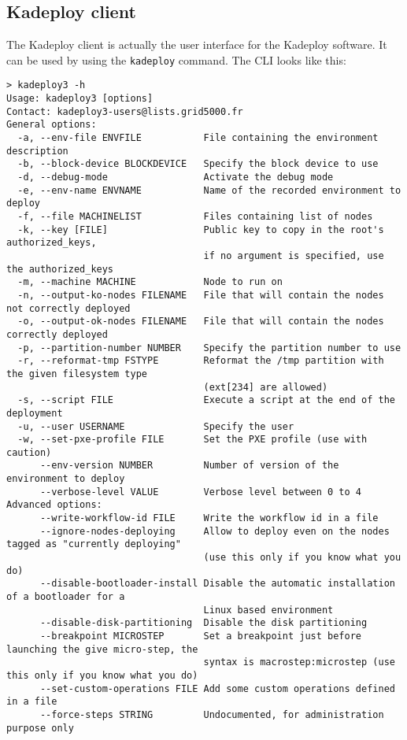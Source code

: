 \documentclass[a4wide,10pt,oneside]{book}
\begin{document}
\subsection{Kadeploy client}
The Kadeploy client is actually the user interface for the Kadeploy software. It can be used by using the \texttt{kadeploy} command. The CLI looks like this:
\begin{small}
\begin{verbatim}
> kadeploy3 -h
Usage: kadeploy3 [options]
Contact: kadeploy3-users@lists.grid5000.fr
General options:
  -a, --env-file ENVFILE           File containing the environment description
  -b, --block-device BLOCKDEVICE   Specify the block device to use
  -d, --debug-mode                 Activate the debug mode
  -e, --env-name ENVNAME           Name of the recorded environment to deploy
  -f, --file MACHINELIST           Files containing list of nodes
  -k, --key [FILE]                 Public key to copy in the root's authorized_keys, 
                                   if no argument is specified, use the authorized_keys
  -m, --machine MACHINE            Node to run on
  -n, --output-ko-nodes FILENAME   File that will contain the nodes not correctly deployed
  -o, --output-ok-nodes FILENAME   File that will contain the nodes correctly deployed
  -p, --partition-number NUMBER    Specify the partition number to use
  -r, --reformat-tmp FSTYPE        Reformat the /tmp partition with the given filesystem type
                                   (ext[234] are allowed)
  -s, --script FILE                Execute a script at the end of the deployment
  -u, --user USERNAME              Specify the user
  -w, --set-pxe-profile FILE       Set the PXE profile (use with caution)
      --env-version NUMBER         Number of version of the environment to deploy
      --verbose-level VALUE        Verbose level between 0 to 4
Advanced options:
      --write-workflow-id FILE     Write the workflow id in a file
      --ignore-nodes-deploying     Allow to deploy even on the nodes tagged as "currently deploying" 
                                   (use this only if you know what you do)
      --disable-bootloader-install Disable the automatic installation of a bootloader for a 
                                   Linux based environment
      --disable-disk-partitioning  Disable the disk partitioning
      --breakpoint MICROSTEP       Set a breakpoint just before launching the give micro-step, the 
                                   syntax is macrostep:microstep (use this only if you know what you do)
      --set-custom-operations FILE Add some custom operations defined in a file
      --force-steps STRING         Undocumented, for administration purpose only

\end{verbatim}
\end{small}
\end{document}

